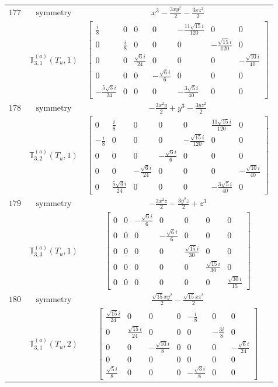 \documentclass[fleqn,8pt,landscape]{jsarticle}
\begin{document}
\begin{longtable}{ccc}
$ 177 $ & $ \text{symmetry} $ & $ x^{3} - \frac{3 x y^{2}}{2} - \frac{3 x z^{2}}{2} $ \\
$  $ & $ \mathbb{T}_{3,1}^{(a)}(T_{u},1) $ & $ \begin{bmatrix} \frac{i}{8} & 0 & 0 & 0 & - \frac{11 \sqrt{15} i}{120} & 0 & 0 \\ 0 & \frac{i}{8} & 0 & 0 & 0 & - \frac{\sqrt{15} i}{120} & 0 \\ 0 & 0 & \frac{\sqrt{6} i}{24} & 0 & 0 & 0 & - \frac{\sqrt{10} i}{40} \\ 0 & 0 & 0 & - \frac{\sqrt{6} i}{6} & 0 & 0 & 0 \\ - \frac{5 \sqrt{3} i}{24} & 0 & 0 & 0 & - \frac{3 \sqrt{5} i}{40} & 0 & 0 \end{bmatrix} $ \\ \hline
$ 178 $ & $ \text{symmetry} $ & $ - \frac{3 x^{2} y}{2} + y^{3} - \frac{3 y z^{2}}{2} $ \\
$  $ & $ \mathbb{T}_{3,2}^{(a)}(T_{u},1) $ & $ \begin{bmatrix} 0 & \frac{i}{8} & 0 & 0 & 0 & \frac{11 \sqrt{15} i}{120} & 0 \\ - \frac{i}{8} & 0 & 0 & 0 & - \frac{\sqrt{15} i}{120} & 0 & 0 \\ 0 & 0 & 0 & - \frac{\sqrt{6} i}{6} & 0 & 0 & 0 \\ 0 & 0 & - \frac{\sqrt{6} i}{24} & 0 & 0 & 0 & - \frac{\sqrt{10} i}{40} \\ 0 & \frac{5 \sqrt{3} i}{24} & 0 & 0 & 0 & - \frac{3 \sqrt{5} i}{40} & 0 \end{bmatrix} $ \\ \hline
$ 179 $ & $ \text{symmetry} $ & $ - \frac{3 x^{2} z}{2} - \frac{3 y^{2} z}{2} + z^{3} $ \\
$  $ & $ \mathbb{T}_{3,3}^{(a)}(T_{u},1) $ & $ \begin{bmatrix} 0 & 0 & - \frac{\sqrt{6} i}{6} & 0 & 0 & 0 & 0 \\ 0 & 0 & 0 & - \frac{\sqrt{6} i}{6} & 0 & 0 & 0 \\ 0 & 0 & 0 & 0 & \frac{\sqrt{15} i}{30} & 0 & 0 \\ 0 & 0 & 0 & 0 & 0 & \frac{\sqrt{15} i}{30} & 0 \\ 0 & 0 & 0 & 0 & 0 & 0 & \frac{\sqrt{30} i}{15} \end{bmatrix} $ \\ \hline
$ 180 $ & $ \text{symmetry} $ & $ \frac{\sqrt{15} x y^{2}}{2} - \frac{\sqrt{15} x z^{2}}{2} $ \\
$  $ & $ \mathbb{T}_{3,1}^{(a)}(T_{u},2) $ & $ \begin{bmatrix} \frac{\sqrt{15} i}{24} & 0 & 0 & 0 & - \frac{i}{8} & 0 & 0 \\ 0 & \frac{\sqrt{15} i}{24} & 0 & 0 & 0 & - \frac{3 i}{8} & 0 \\ 0 & 0 & - \frac{\sqrt{10} i}{8} & 0 & 0 & 0 & - \frac{\sqrt{6} i}{24} \\ 0 & 0 & 0 & 0 & 0 & 0 & 0 \\ \frac{\sqrt{5} i}{8} & 0 & 0 & 0 & - \frac{\sqrt{3} i}{8} & 0 & 0 \end{bmatrix} $ \\ \hline

\end{longtable}
\end{document}
